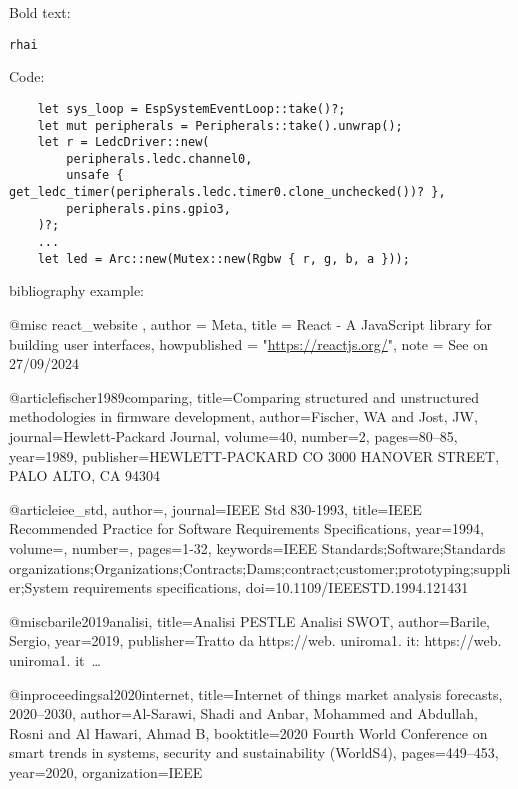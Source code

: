 Bold text:

\texttt{rhai}

Code:

\begin{listing}[H]
    \begin{verbatim}
    let sys_loop = EspSystemEventLoop::take()?;
    let mut peripherals = Peripherals::take().unwrap();
    let r = LedcDriver::new(
        peripherals.ledc.channel0,
        unsafe { get_ledc_timer(peripherals.ledc.timer0.clone_unchecked())? },
        peripherals.pins.gpio3,
    )?;
    ...
    let led = Arc::new(Mutex::new(Rgbw { r, g, b, a }));
\end{verbatim}
\vspace{-1em}
\end{listing}

bibliography example:

@misc{ react_website ,
    author = {Meta},
    title = {React - A JavaScript library for building user interfaces},
    howpublished = "\url{https://reactjs.org/}",
    note = {See on 27/09/2024}
}

@article{fischer1989comparing,
  title={Comparing structured and unstructured methodologies in firmware development},
  author={Fischer, WA and Jost, JW},
  journal={Hewlett-Packard Journal},
  volume={40},
  number={2},
  pages={80--85},
  year={1989},
  publisher={HEWLETT-PACKARD CO 3000 HANOVER STREET, PALO ALTO, CA 94304}
}

@article{iee_std,
  author={},
  journal={IEEE Std 830-1993},
  title={IEEE Recommended Practice for Software Requirements Specifications},
  year={1994},
  volume={},
  number={},
  pages={1-32},
  keywords={IEEE Standards;Software;Standards organizations;Organizations;Contracts;Dams;contract;customer;prototyping;supplier;System requirements specifications},
  doi={10.1109/IEEESTD.1994.121431}
}

@misc{barile2019analisi,
  title={Analisi PESTLE Analisi SWOT},
  author={Barile, Sergio},
  year={2019},
  publisher={Tratto da https://web. uniroma1. it: https://web. uniroma1. it~…}
}

@inproceedings{al2020internet,
  title={Internet of things market analysis forecasts, 2020--2030},
  author={Al-Sarawi, Shadi and Anbar, Mohammed and Abdullah, Rosni and Al Hawari, Ahmad B},
  booktitle={2020 Fourth World Conference on smart trends in systems, security and sustainability (WorldS4)},
  pages={449--453},
  year={2020},
  organization={IEEE}
}

